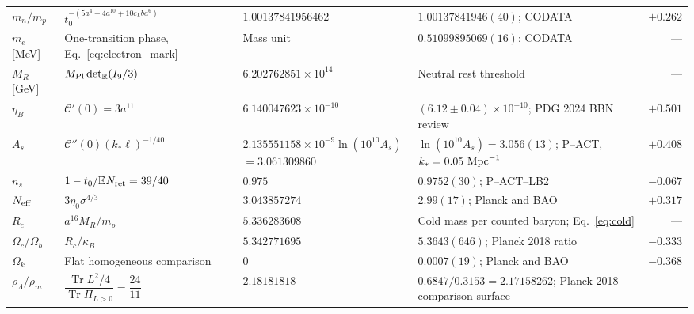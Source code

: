 \documentclass[aps,prx,reprint,longbibliography]{revtex4-2}
\providecommand{\Tr}{\operatorname{Tr}}
\providecommand{\E}{\mathbb E}
\begin{document}
\begin{longtable}{@{}L{.125\textwidth}L{.255\textwidth}L{.18\textwidth}L{.32\textwidth}r@{}}
$m_n/m_p$ & $t_0^{-(5a^4+4a^{10}+10c_Lba^6)}$ & $1.00137841956462$ & $1.00137841946(40)$; CODATA~\cite{CODATA} & $+0.262$\\
$m_e$ [MeV] & One-transition phase, Eq.~\eqref{eq:electron_mark} & Mass unit & $0.51099895069(16)$; CODATA~\cite{CODATA} & ---\\
$M_R$ [GeV] & $M_{\rm Pl}\det_{\mathbb R}(I_9/3)$ & $6.202762851\times10^{14}$ & Neutral rest threshold & ---\\
$\eta_B$ & $\mathcal C'(0)=3a^{11}$ & $6.140047623\times10^{-10}$ & $(6.12\pm0.04)\times10^{-10}$; PDG 2024 BBN review~\cite{PDG2024} & $+0.501$\\
$A_s$ & $\mathcal C''(0)(k_*\ell)^{-1/40}$ & $2.135551158\times10^{-9}$\newline $\ln(10^{10}A_s)$\newline $=3.061309860$ & $\ln(10^{10}A_s)=3.056(13)$; P--ACT, $k_*=0.05\ {\rm Mpc}^{-1}$~\cite{ACT} & $+0.408$\\
$n_s$ & $1-t_0/\E N_{\rm ret}=39/40$ & $0.975$ & $0.9752(30)$; P--ACT--LB2~\cite{ACT} & $-0.067$\\
$N_{\rm eff}$ & $3\eta_0\sigma^{4/3}$ & $3.043857274$ & $2.99(17)$; Planck and BAO~\cite{Planck} & $+0.317$\\
$R_c$ & $a^{16}M_R/m_p$ & $5.336283608$ & Cold mass per counted baryon; Eq.~\eqref{eq:cold} & ---\\
$\Omega_c/\Omega_b$ & $R_c/\kappa_B$ & $5.342771695$ & $5.3643(646)$; Planck 2018 ratio~\cite{Planck} & $-0.333$\\
$\Omega_k$ & Flat homogeneous comparison & $0$ & $0.0007(19)$; Planck and BAO~\cite{Planck} & $-0.368$\\
$\rho_\Lambda/\rho_m$ & $\dfrac{\Tr L^2/4}{\Tr\Pi_{L>0}}=\dfrac{24}{11}$ & $2.18181818$ & $0.6847/0.3153=2.17158262$; Planck 2018 comparison surface~\cite{Planck} & ---\\
\end{longtable}
\end{document}
